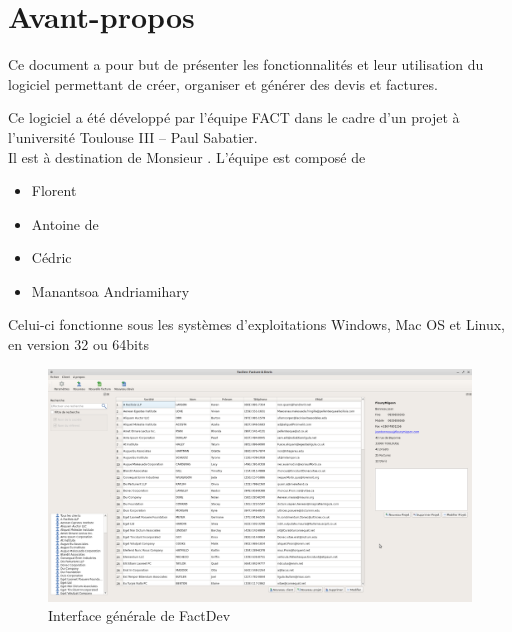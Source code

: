 \chapter*{Avant-propos}
Ce document a pour but de présenter les fonctionnalités et leur utilisation du logiciel permettant
de créer, organiser et générer des devis et factures. 

Ce logiciel a été développé par l'équipe FACT dans le cadre d'un projet à l'université Toulouse III -- Paul Sabatier. \\
Il est à destination de Monsieur .
L'équipe est composé de 
\begin{itemize}
	\item Florent 
	\item Antoine de 
	\item Cédric 
	\item Manantsoa Andriamihary 
\end{itemize}

Celui-ci fonctionne sous les systèmes d’exploitations Windows, Mac OS et Linux, en version 32 ou 64bits
\begin{figure}[H]
	\centering
	\includegraphics[width=15cm]{screens/intro.png}
	\caption{Interface générale de FactDev}
	\label{fig:intro}
\end{figure}
